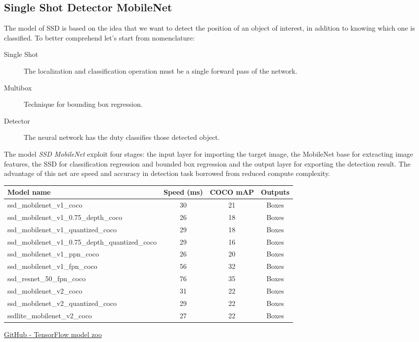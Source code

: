 \subsection{Single Shot Detector MobileNet}
\label{ssec:single-shot-detector}
The model of SSD is based on the idea that we want to detect the position of an 
object of interest, in addition to knowing which one is classified. 
To better comprehend let’s start from nomenclature: 
\begin{description}
\item[Single Shot] The localization and classification operation must be a single forward pass of the network.
\item[Multibox] Technique for bounding box regression.
\item[Detector] The neural network has the duty classifies those detected object.
\end{description}
%
The model \emph{SSD MobileNet} exploit four stages: the input layer for
importing the target image, the MobileNet base for extracting image features,
the SSD for classification regression and bounded box regression and the output
layer for exporting the detection result.\cite{Li_2018} 
The advantage of this net are speed and accuracy in detection task borrowed from
reduced compute complexity.
%
\begin{table}[htb]
	\centering
	\begin{tabular}{l c c c}
	\hline
		Model name								&Speed (ms)	& COCO mAP\footnotemark	& Outputs\\
		\hline
		ssd\_mobilenet\_v1\_coco					&	30		&	21		&	Boxes\\
		ssd\_mobilenet\_v1\_0.75\_depth\_coco 		&	26		&	18		&	Boxes\\
		ssd\_mobilenet\_v1\_quantized\_coco 		&	29		&	18		&	Boxes\\
	ssd\_mobilenet\_v1\_0.75\_depth\_quantized\_coco 	&	29		&	16		&	Boxes\\
		ssd\_mobilenet\_v1\_ppn\_coco 				&	26		&	20		&	Boxes\\
		ssd\_mobilenet\_v1\_fpn\_coco 				&	56		&	32		&	Boxes\\
		ssd\_resnet\_50\_fpn\_coco 					&	76		&	35		&	Boxes\\
		ssd\_mobilenet\_v2\_coco					&	31		&	22		&	Boxes\\
		ssd\_mobilenet\_v2\_quantized\_coco			&	29		&	22		&	Boxes\\
		ssdlite\_mobilenet\_v2\_coco				&	27		&	22		&	Boxes\\
		\hline
	\end{tabular}
	{\href{https://github.com/tensorflow/models/blob/master/research/object_detection/g3doc/detection_model_zoo.md}{GitHub - TensorFlow model zoo}}
	\label{tab:mobilent-timing}
\end{table}
